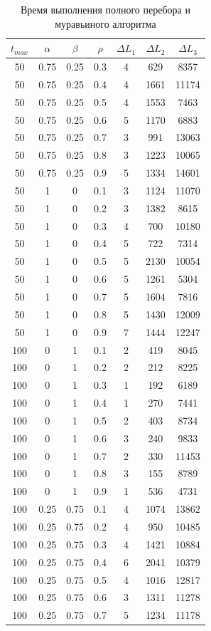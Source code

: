 \documentclass[12pt]{report}
\begin{document}
	\begin{table}[H]
		\begin{center}
			\caption[]{\label{tbl:only2} Время выполнения полного перебора и муравьиного алгоритма}
			\begin{tabular}{|c|c|c|c|c|c|c|}
				\hline
				$t_{max}$ & $\alpha$ & $\beta$ & $\rho$ & $\Delta L_{1}$ & $\Delta L_{2}$ & $\Delta L_{3}$\\
				\hline
				50 & 0.75 & 0.25 & 0.3 & 4 & 629 & 8357 \\
				50 & 0.75 & 0.25 & 0.4 & 4 & 1661 & 11174 \\
				50 & 0.75 & 0.25 & 0.5 & 4 & 1553 & 7463 \\
				50 & 0.75 & 0.25 & 0.6 & 5 & 1170 & 6883 \\
				50 & 0.75 & 0.25 & 0.7 & 3 & 991 & 13063 \\
				50 & 0.75 & 0.25 & 0.8 & 3 & 1223 & 10065 \\
				50 & 0.75 & 0.25 & 0.9 & 5 & 1334 & 14601 \\
				50 & 1 & 0 & 0.1 & 3 & 1124 & 11070 \\
				50 & 1 & 0 & 0.2 & 3 & 1382 & 8615 \\
				50 & 1 & 0 & 0.3 & 4 & 700 & 10180 \\
				50 & 1 & 0 & 0.4 & 5 & 722 & 7314 \\
				50 & 1 & 0 & 0.5 & 5 & 2130 & 10054 \\
				50 & 1 & 0 & 0.6 & 5 & 1261 & 5304 \\
				50 & 1 & 0 & 0.7 & 5 & 1604 & 7816 \\
				50 & 1 & 0 & 0.8 & 5 & 1430 & 12009 \\
				50 & 1 & 0 & 0.9 & 7 & 1444 & 12247 \\
				100 & 0 & 1 & 0.1 & 2 & 419 & 8045 \\
				100 & 0 & 1 & 0.2 & 2 & 212 & 8225 \\
				100 & 0 & 1 & 0.3 & 1 & 192 & 6189 \\
				100 & 0 & 1 & 0.4 & 1 & 270 & 7441 \\
				100 & 0 & 1 & 0.5 & 2 & 403 & 8734 \\
				100 & 0 & 1 & 0.6 & 3 & 240 & 9833 \\
				100 & 0 & 1 & 0.7 & 2 & 330 & 11453 \\
				100 & 0 & 1 & 0.8 & 3 & 155 & 8789 \\
				100 & 0 & 1 & 0.9 & 1 & 536 & 4731 \\
				100 & 0.25 & 0.75 & 0.1 & 4 & 1074 & 13862 \\
				100 & 0.25 & 0.75 & 0.2 & 4 & 950 & 10485 \\
				100 & 0.25 & 0.75 & 0.3 & 4 & 1421 & 10884 \\
				100 & 0.25 & 0.75 & 0.4 & 6 & 2041 & 10379 \\
				100 & 0.25 & 0.75 & 0.5 & 4 & 1016 & 12817 \\
				100 & 0.25 & 0.75 & 0.6 & 3 & 1311 & 11278 \\
				100 & 0.25 & 0.75 & 0.7 & 5 & 1234 & 11178 \\
				\hline
				
			\end{tabular}
		\end{center}
	\end{table}
\end{document}
